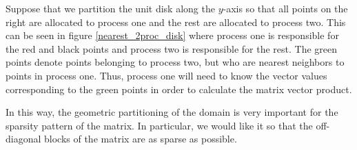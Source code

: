 \documentclass[12pt]{article}
\begin{document}
	Suppose that we partition the unit disk along the $y$-axis so that all points on the right are allocated to process one and the rest are allocated to process two. This can be seen in figure \ref{nearest_2proc_disk} where process one is responsible for the red and black points and process two is responsible for the rest. The green points denote points belonging to process two, but who are nearest neighbors to points in process one. Thus, process one will need to know the vector values corresponding to the green points in order to calculate the matrix vector product. 
	
	In this way, the geometric partitioning of the domain is very important for the sparsity pattern of the matrix. In particular, we would like it so that the off-diagonal blocks of the matrix are as sparse as possible. 
	
\end{document}
